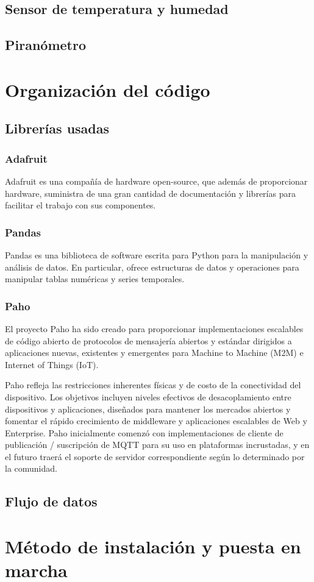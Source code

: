 \subsection{Sensor de temperatura y humedad}
\subsection{Piranómetro}

\section{Organización del código}
\label{makereference4.3} 
	\subsection{Librerías usadas}
		\subsubsection{Adafruit}
		Adafruit es una compañía de hardware open-source, que además de proporcionar hardware, suministra de una gran cantidad de documentación y librerías para facilitar el trabajo con sus componentes.
		
		\subsubsection{Pandas}
		Pandas es una biblioteca de software escrita para Python para la manipulación y análisis de datos. En particular, ofrece estructuras de datos y operaciones para manipular tablas numéricas y series temporales.
		
		\subsubsection{Paho}
		El proyecto Paho ha sido creado para proporcionar implementaciones escalables de código abierto de protocolos de mensajería abiertos y estándar dirigidos a aplicaciones nuevas, existentes y emergentes para Machine to Machine (M2M) e Internet of Things (IoT).
		
		Paho refleja las restricciones inherentes físicas y de costo de la conectividad del dispositivo. Los objetivos incluyen niveles efectivos de desacoplamiento entre dispositivos y aplicaciones, diseñados para mantener los mercados abiertos y fomentar el rápido crecimiento de middleware y aplicaciones escalables de Web y Enterprise. Paho inicialmente comenzó con implementaciones de cliente de publicación / suscripción de MQTT para su uso en plataformas incrustadas, y en el futuro traerá el soporte de servidor correspondiente según lo determinado por la comunidad.
		
	\subsection{Flujo de datos}

\section{Método de instalación y puesta en marcha}
\label{makereference4.4}